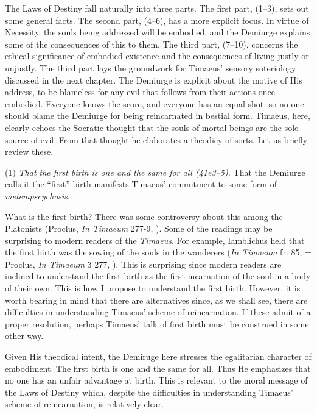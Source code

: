The Laws of Destiny fall naturally into three parts. The first part, (1--3), sets out some general facts. The second part, (4--6), has a more explicit focus. In virtue of Necessity, the souls being addressed will be embodied, and the Demiurge explains some of the consequences of this to them. The third part, (7--10), concerns the ethical significance of embodied existence and the consequences of living justly or unjustly. The third part lays the groundwork for Timaeus' sensory soteriology discussed in the next chapter. The Demiurge is explicit about the motive of His address, to be blameless for any evil that follows from their actions once embodied. Everyone knows the score, and everyone has an equal shot, so no one should blame the Demiurge for being reincarnated in bestial form. Timaeus, here, clearly echoes the Socratic thought that the souls of mortal beings are the sole source of evil. From that thought he elaborates a theodicy of sorts. Let us briefly review these.

(1) \emph{That the first birth is one and the same for all (41e3--5).} That the Demiurge calls it the ``first'' birth manifests Timaeus' commitment to some form of \emph{metempscychosis}.

What is the first birth? There was some controversy about this among the Platonists (Proclus, \emph{In Timaeum} 277-9, \citealt{Diehl:1903re}). Some of the readings may be surprising to modern readers of the \emph{Timaeus}. For example, Iamblichus held that the first birth was the sowing of the souls in the wanderers (\emph{In Timaeum} fr. 85, \citealt{Dillon:1973qv} = Proclus, \emph{In Timaeum} 3 277, \citealt{Diehl:1903re}). This is surprising since modern readers are inclined to understand the first birth as the first incarnation of the soul in a body of their own. This is how I propose to understand the first birth. However, it is worth bearing in mind that there are alternatives since, as we shall see, there are difficulties in understanding Timaeus' scheme of reincarnation. If these admit of a proper resolution, perhaps Timaeus' talk of first birth must be construed in some other way.

Given His theodical intent, the Demiruge here stresses the egalitarian character of embodiment. The first birth is one and the same for all. Thus He emphasizes that no one has an unfair advantage at birth. This is relevant to the moral message of the Laws of Destiny which, despite the difficulties in understanding Timaeus' scheme of reincarnation, is relatively clear.

